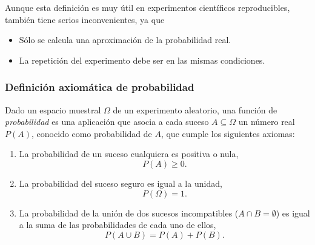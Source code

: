 \begin{frame}
{Aunque esta definición es muy útil en experimentos científicos reproducibles, también tiene serios inconvenientes, ya que
\begin{itemize}
\item Sólo se calcula una aproximación de la probabilidad real.
\item La repetición del experimento debe ser en las mismas condiciones.  
\end{itemize}
}
\end{frame}


\begin{frame}
\frametitle{Definición axiomática de probabilidad}
\begin{definicion}[Kolmogórov]
Dado un espacio muestral $\Omega$ de un experimento aleatorio, una función de \emph{probabilidad} es una aplicación que asocia a cada suceso $A\subseteq \Omega$ un número real $P(A)$, conocido como probabilidad de $A$, que cumple los siguientes axiomas:
\begin{enumerate}
\item La probabilidad de un suceso cualquiera es positiva o nula,
\[
	P(A)\geq 0.
\]
\item La probabilidad del suceso seguro es igual a la unidad,
\[
	P(\Omega)=1.
\]
\item La probabilidad de la unión de dos sucesos incompatibles ($A\cap B=\emptyset$) es igual a la suma de las probabilidades de cada uno de ellos,
\[
	P(A\cup B) = P(A)+P(B).
\]
\end{enumerate}
\end{definicion}

\end{frame}


